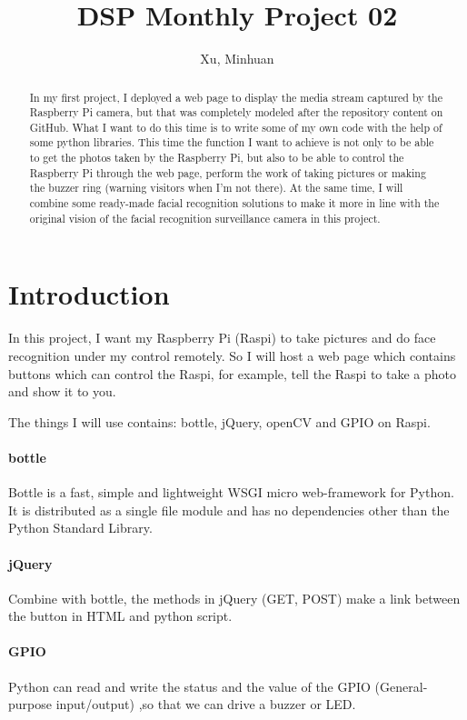 \documentclass{article}
\begin{document}
\title{DSP Monthly Project 02}
\author{Xu, Minhuan}
\maketitle
\tableofcontents
\begin{abstract}
In my first project, I deployed a web page to display the media stream captured by the Raspberry Pi camera, but that was completely modeled after the repository content on GitHub. What I want to do this time is to write some of my own code with the help of some python libraries. This time the function I want to achieve is not only to be able to get the photos taken by the Raspberry Pi, but also to be able to control the Raspberry Pi through the web page, perform the work of taking pictures or making the buzzer ring (warning visitors when I'm not there). At the same time, I will combine some ready-made facial recognition solutions to make it more in line with the original vision of the facial recognition surveillance camera in this project.
\end{abstract}

\section{Introduction}
In this project, I want my Raspberry Pi (Raspi) to take pictures and do face recognition under my control remotely\cite{webcontrol}. So I will host a web page which contains buttons which can control the Raspi, for example, tell the Raspi to take a photo and show it to you.

The things I will use contains: bottle, jQuery, openCV and GPIO on Raspi.
\paragraph*{bottle}
Bottle is a fast, simple and lightweight WSGI micro web-framework for Python. It is distributed as a single file module and has no dependencies other than the Python Standard Library. \cite{bottle-py}

\paragraph*{jQuery}
Combine with bottle, the methods in jQuery (GET, POST) make a link between the button in HTML and python script.
\paragraph*{GPIO}
Python can read and write the status and the value of the GPIO (General-purpose input/output) ,so that we can drive a buzzer or LED.
\end{document}
